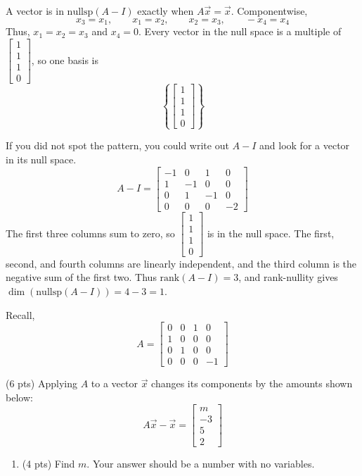 \documentclass[11pt]{article}
\begin{document}
\begin{prob}[(16 pts)]
\begin{subprob}
\begin{solution}
A vector is in $\text{nullsp}(A-I)$ exactly when $A\vec x=\vec x$. Componentwise,
\[
x_3=x_1,\qquad x_1=x_2,\qquad x_2=x_3,\qquad -x_4=x_4
\]
Thus, $x_1=x_2=x_3$ and $x_4=0$. Every vector in the null space is a multiple of $\begin{bmatrix}1\\1\\1\\0\end{bmatrix}$, so one basis is
\[
\boxed{\left\{\begin{bmatrix}1\\1\\1\\0\end{bmatrix}\right\}}
\]

If you did not spot the pattern, you could write out $A-I$ and look for a vector in its null space.
\[
A-I=\begin{bmatrix}
-1&0&1&0\\
1&-1&0&0\\
0&1&-1&0\\
0&0&0&-2
\end{bmatrix}
\]
The first three columns sum to zero, so $\begin{bmatrix}1\\1\\1\\0\end{bmatrix}$ is in the null space. The first, second, and fourth columns are linearly independent, and the third column is the negative sum of the first two. Thus $\text{rank}(A-I)=3$, and rank-nullity gives $\dim(\text{nullsp}(A-I))=4-3=1$.
\end{solution}
\end{subprob}
\newpage

Recall,
\[
A=\begin{bmatrix}
0&0&1&0\\
1&0&0&0\\
0&1&0&0\\
0&0&0&-1
\end{bmatrix}
\]
\begin{subprob}(6 pts)
Applying $A$ to a vector $\vec x$ changes its components by the amounts shown below:
\[
A\vec x-\vec x=\begin{bmatrix}m\\-3\\5\\2\end{bmatrix}
\]
\begin{enumerate}[label=(\roman*)]
\item (4 pts) Find $m$. Your answer should be a number with no variables.\par\vspace{0.2em}


\end{enumerate}
\end{subprob}
\end{prob}
\end{document}
